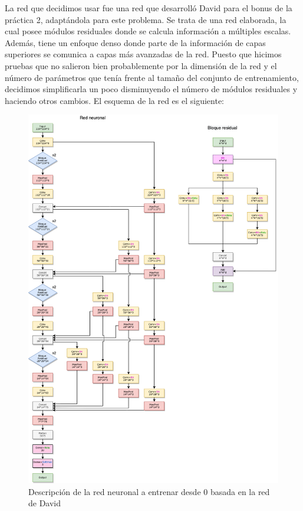 \documentclass[11pt,a4paper]{article}
\theoremstyle{definition}
\begin{document}
La red que decidimos usar fue una red que desarrolló David para el bonus de la práctica 2, adaptándola para este problema. Se trata de una red elaborada, la cual posee módulos residuales donde se calcula información a múltiples escalas. Además,  tiene un enfoque denso donde parte de la información de capas superiores se comunica a capas más avanzadas de la red.  Puesto que hicimos pruebas que no salieron bien probablemente por la dimensión de la red y el número de parámetros que tenía frente al tamaño del conjunto de entrenamiento, decidimos simplificarla un poco disminuyendo el número de módulos residuales y haciendo otros cambios. El esquema de la red es el siguiente:

\begin{figure}[H]
  \centering
    \includegraphics[scale=0.5]{./images/ScratchDavid.png}
	\caption{Descripción de la red neuronal a entrenar desde 0 basada en la red de David}

\end{figure}
\end{document}
